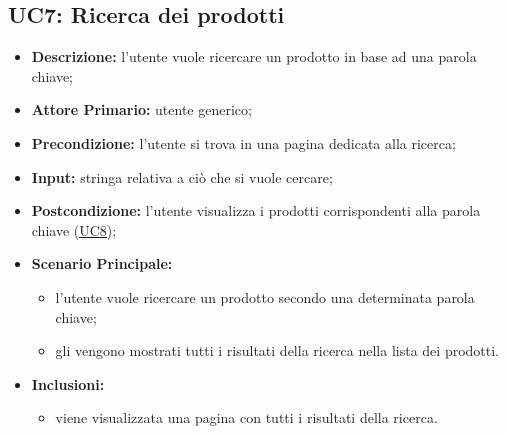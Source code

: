 
        \subsection{UC7: Ricerca dei prodotti}
        \label{sec:UC7}
        \begin{itemize}
            \item \textbf{Descrizione:} l'utente vuole ricercare un prodotto in base ad una parola chiave; 
            \item \textbf{Attore Primario:} utente generico;
            \item \textbf{Precondizione:} l'utente si trova in una pagina dedicata alla ricerca; 
            \item \textbf{Input:} stringa relativa a ciò che si vuole cercare;
            \item \textbf{Postcondizione:} l'utente visualizza i prodotti corrispondenti alla parola chiave (\hyperref[sec:UC8]{\underline{UC8}});
            \item \textbf{Scenario Principale:}
            \begin{itemize}
                \item l'utente vuole ricercare un prodotto secondo una determinata parola chiave;
                \item gli vengono mostrati tutti i risultati della ricerca nella lista dei prodotti.
            \end{itemize}
            \item \textbf{Inclusioni:}
            \begin{itemize}
                \item viene visualizzata una pagina con tutti i risultati della ricerca.
            \end{itemize}
        \end{itemize}